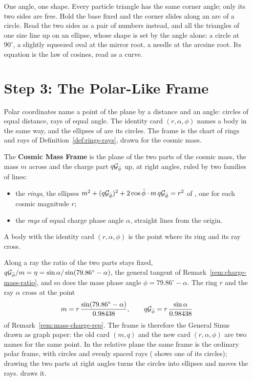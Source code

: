 \begin{plainwords}
One angle, one shape. Every particle triangle has the same corner angle; only its two sides are free. Hold the base fixed and the corner slides along an arc of a circle. Read the two sides as a pair of numbers instead, and all the triangles of one size line up on an ellipse, whose shape is set by the angle alone: a circle at $90^\circ$, a slightly squeezed oval at the mirror root, a needle at the arcsine root. Its equation is the law of cosines, read as a curve.
\end{plainwords}

\section{Step 3: The Polar-Like Frame}\label{sec:sm-frame}

Polar coordinates name a point of the plane by a distance and an angle: circles of equal distance, rays of equal angle. The identity card $(r, \alpha, \phi)$ names a body in the same way, and the ellipses of  are its circles. The frame is the chart of rings and rays of Definition~\ref{def:rings-rays}, drawn for the cosmic mass.

\begin{definition}\label{def:cm-frame}
The \textbf{Cosmic Mass Frame} is the plane of the two parts of the cosmic mass, the mass $m$ across and the charge part $q\mathcal{G}_{\bar{\phi}}$ up, at right angles, ruled by two families of lines:
\begin{itemize}
  \item the \emph{rings}, the ellipses $m^2 + (q\mathcal{G}_{\bar{\phi}})^2 + 2\cos\bar{\phi}\cdot m\,q\mathcal{G}_{\bar{\phi}} = r^2$ of , one for each cosmic magnitude $r$;
  \item the \emph{rays} of equal charge phase angle $\alpha$, straight lines from the origin.
\end{itemize}
A body with the identity card $(r, \alpha, \phi)$ is the point where its ring and its ray cross.
\end{definition}

Along a ray the ratio of the two parts stays fixed, $q\mathcal{G}_{\bar{\phi}}/m = \eta = \sin\alpha/\sin(79.86^\circ - \alpha)$, the general tangent of Remark~\ref{rem:charge-mass-ratio}, and so does the mass phase angle $\phi = 79.86^\circ - \alpha$. The ring $r$ and the ray $\alpha$ cross at the point
\[
m = r\,\frac{\sin(79.86^\circ - \alpha)}{0.98438}, \qquad q\mathcal{G}_{\bar{\phi}} = r\,\frac{\sin\alpha}{0.98438}
\]
of Remark~\ref{rem:mass-charge-rep}. The frame is therefore the General Sinus drawn as graph paper: the old card $(m, q)$ and the new card $(r, \alpha, \phi)$ are two names for the same point. In the relative plane the same frame is the ordinary polar frame, with circles and evenly spaced rays ( shows one of its circles); drawing the two parts at right angles turns the circles into ellipses and moves the rays.  draws it.

